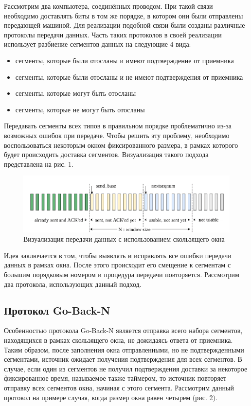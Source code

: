 Рассмотрим два компьютера, соединённых проводом. При такой связи необходимо доставлять биты в том же порядке, в котором они были отправлены передающей машиной. Для реализации подобной связи были созданы различные протоколы передачи данных. Часть таких протоколов в своей реализации использует разбиение сегментов данных на следующие 4 вида:

\begin{itemize}
	\item сегменты, которые были отосланы и имеют подтверждение от
	приемника
	\item сегменты, которые были отосланы и не имеют подтверждения от
	приемника
	\item сегменты, которые могут быть отосланы
	\item сегменты, которые не могут быть отосланы
\end{itemize}

Передавать сегменты всех типов в правильном порядке проблематично из-за возможных ошибок при передаче. Чтобы решить эту проблему, необходимо воспользоваться некоторым окном фиксированного размера, в рамках которого будет происходить доставка сегментов. Визуализация такого подхода представлена на рис. 1.

\begin{figure}[H]
	\begin{center}
		\includegraphics{im1}
		\caption{Визуализация передачи данных с использованием скользящего окна}
	\end{center}
\end{figure}

Идея заключается в том, чтобы выявлять и исправлять все ошибки передачи данных в рамках окна. После этого происходит его смещение к сегментам с большим порядковым номером и процедура передачи повторяется. Рассмотрим два протокола, использующих данный подход.

\subsection{Протокол Go-Back-N}

Особенностью протокола Go-Back-N является отправка всего набора сегментов, находящихся в рамках скользящего окна, не дожидаясь ответа от приемника. Таким образом, после заполнения окна отправленными, но не
подтвержденными сегментами, источник ожидает получения подтверждения
для всех сегментов. В случае, если один из сегментов не получил
подтверждения доставки за некоторое фиксированное время, называемое
также таймером, то источник повторяет отправку всех сегментов окна,
начиная с этого сегмента. Рассмотрим данный протокол на примере случая,
когда размер окна равен четырем (рис. 2).

